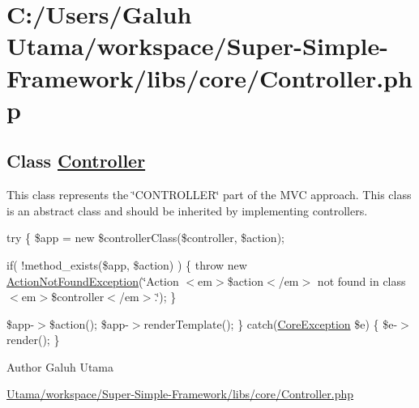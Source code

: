 \hypertarget{_c_1_2_users_2_galuh_01_utama_2workspace_2_super-_simple-_framework_2libs_2core_2_controller_8php-example}{\section{\-C\-:/\-Users/\-Galuh Utama/workspace/\-Super-\/\-Simple-\/\-Framework/libs/core/\-Controller.\-php}
}
\subsection*{\-Class \hyperlink{class_controller}{\-Controller}}

\-This class represents the \char`\"{}\-C\-O\-N\-T\-R\-O\-L\-L\-E\-R\char`\"{} part of the \-M\-V\-C approach. \-This class is an abstract class and should be inherited by implementing controllers. 

{\ttfamily  try \{ \$app = new \$controller\-Class(\$controller, \$action);}

{\ttfamily  if( !method\-\_\-exists(\$app, \$action) ) \{ throw new \hyperlink{class_action_not_found_exception}{\-Action\-Not\-Found\-Exception}(\char`\"{}\-Action $<$em$>$\$action$<$/em$>$
          	not found in class $<$em$>$\$controller$<$/em$>$.\char`\"{}); \}}

{\ttfamily  \$app-\/$>$\$action(); \$app-\/$>$render\-Template(); \} catch(\hyperlink{class_core_exception}{\-Core\-Exception} \$e) \{ \$e-\/$>$render(); \} }

\begin{DoxyAuthor}{\-Author}
\-Galuh \-Utama
\end{DoxyAuthor}

\begin{DoxyCodeInclude}
\end{DoxyCodeInclude}
 \hyperlink{_controller_8php_source}{\-Utama/workspace/\-Super-\/\-Simple-\/\-Framework/libs/core/\-Controller.\-php} 